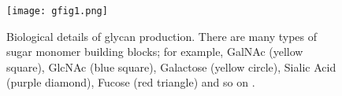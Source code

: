 %


\begin{figure}[t]
  \centering
  \begin{minipage}{0.54\linewidth}
    \texttt{[image: gfig1.png]}    
  \end{minipage}
  \begin{minipage}{0.44\linewidth}
    \caption{Biological details of glycan production. There are many types of sugar monomer building blocks; %
      for example, GalNAc (yellow square), GlcNAc (blue square), Galactose (yellow circle), Sialic Acid (purple diamond), Fucose (red triangle) and so on \cite{Varki2017}.}
    \label{fig:glycan-rule}
  \end{minipage}
\end{figure}


